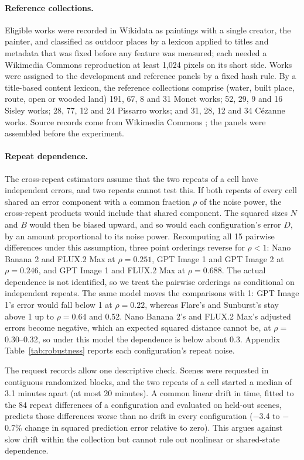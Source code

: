 \paragraph{Reference collections.}
Eligible works were recorded in Wikidata as paintings with a single creator, the painter, and
classified as outdoor places by a lexicon applied to titles and metadata that was fixed before
any feature was measured; each needed a Wikimedia Commons reproduction at least 1,024 pixels on
its short side. Works were assigned to the development and reference panels by a fixed hash
rule. By a title-based content lexicon, the reference collections comprise (water, built place,
route, open or wooded land) 191, 67, 8 and 31 Monet works; 52, 29, 9 and 16 Sisley works; 28,
77, 12 and 24 Pissarro works; and 31, 28, 12 and 34 C\'ezanne works. Source records come from Wikimedia
Commons \citep{wikimediacommons}; the panels were assembled before the experiment.

\paragraph{Repeat dependence.}
The cross-repeat estimators assume that the two repeats of a cell have independent errors, and
two repeats cannot test this. If both repeats of every cell shared an error component with a
common fraction $\rho$ of the noise power, the cross-repeat products would include that shared
component. The squared sizes $N$ and $B$ would then be biased upward, and so would each
configuration's error $D$, by an amount proportional to its noise power. Recomputing all 15
pairwise differences under this assumption, three point orderings reverse for $\rho<1$: Nano
Banana 2 and FLUX.2 Max at $\rho=0.251$, GPT Image 1 and GPT Image 2 at $\rho=0.246$, and GPT
Image 1 and FLUX.2 Max at $\rho=0.688$. The actual dependence is not identified, so we treat the
pairwise orderings as conditional on independent repeats. The same model moves the comparisons
with 1: GPT Image 1's error would fall below 1 at $\rho=0.22$, whereas Flare's and Sunburst's stay
above 1 up to $\rho=0.64$ and 0.52. Nano Banana 2's and FLUX.2 Max's adjusted errors become negative,
which an expected squared distance cannot be, at $\rho=$ 0.30--0.32, so under this model the
dependence is below about 0.3. Appendix Table~\ref{tab:robustness} reports each configuration's
repeat noise.

The request records allow one descriptive check. Scenes were requested in contiguous randomized
blocks, and the two repeats of a cell started a median of 3.1 minutes apart (at most 20 minutes).
A common linear drift in time, fitted to the 84 repeat differences of a configuration and
evaluated on held-out scenes, predicts those differences worse than no drift in every
configuration ($-$3.4 to $-$0.7\% change in squared prediction error relative to zero). This
argues against slow drift within the collection but cannot rule out nonlinear or shared-state
dependence.

